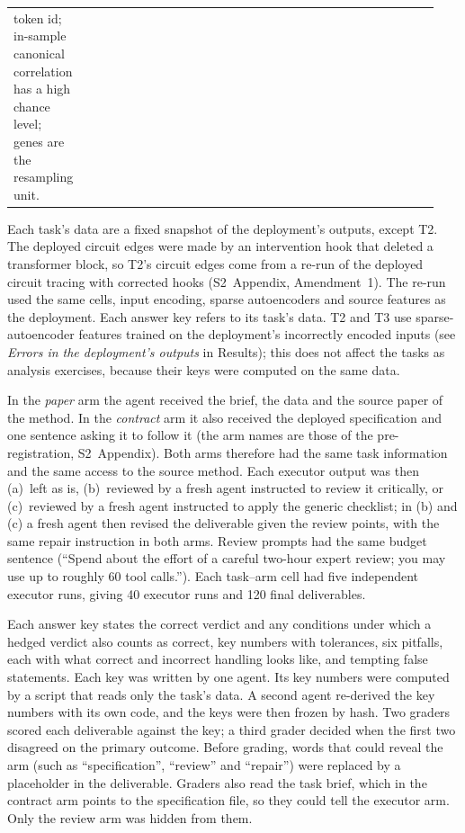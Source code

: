 \documentclass[10pt,letterpaper]{article}
\begin{document}
{\begin{longtable}{@{}p{0.06\linewidth}p{0.30\linewidth}p{0.22\linewidth}p{0.36\linewidth}@{}}
token id; in-sample canonical correlation has a high chance level; genes
are the resampling unit. \\
\end{longtable}
\begin{flushleft}
Each task's data are a fixed snapshot of
the deployment's outputs, except T2. The deployed circuit edges were made
by an intervention hook that deleted a transformer block, so T2's circuit edges come from a re-run
of the deployed circuit tracing with corrected hooks (S2~Appendix,
Amendment~1). The re-run used the same cells, input encoding, sparse
autoencoders and source features as the deployment. Each answer key
refers to its task's data. T2 and T3 use sparse-autoencoder features trained on the deployment's incorrectly
encoded inputs (see \emph{Errors in the deployment's outputs} in
Results); this does not affect the tasks as analysis exercises, because
their keys were computed on the same data.
\end{flushleft}
}


In the \emph{paper} arm the agent received the brief, the data and the
source paper of the method. In the \emph{contract} arm it also received
the deployed specification and one sentence asking it to follow it (the
arm names are those of the pre-registration, S2~Appendix). Both arms
therefore had the same task information and the same access to the
source method. Each executor output was then (a)~left as is,
(b)~reviewed by a fresh agent instructed to review it critically, or
(c)~reviewed by a fresh agent instructed to apply the generic checklist;
in (b) and (c) a fresh agent then revised the deliverable given the
review points, with the same repair instruction in both arms. Review
prompts had the same budget sentence (``Spend about the effort of a
careful two-hour expert review; you may use up to roughly 60 tool
calls.''). Each task--arm cell had five
independent executor runs, giving 40 executor runs and 120 final
deliverables.

Each answer key states the correct verdict and any conditions under which
a hedged verdict also counts as correct, key numbers with tolerances,
six pitfalls, each with what correct and incorrect handling looks like,
and tempting false statements. Each key was written by one agent. Its key numbers were computed by a
script that reads only the task's data. A second agent re-derived the key
numbers with its own code, and the keys were then frozen by hash. Two graders scored each deliverable against the key;
a third grader decided when the first two disagreed on the primary
outcome. Before grading, words that could reveal the arm (such as
``specification'', ``review'' and ``repair'') were replaced by a
placeholder in the deliverable. Graders also read the task brief, which in
the contract arm points to the specification file, so they could tell the
executor arm. Only the review arm was hidden from them.
\end{document}

